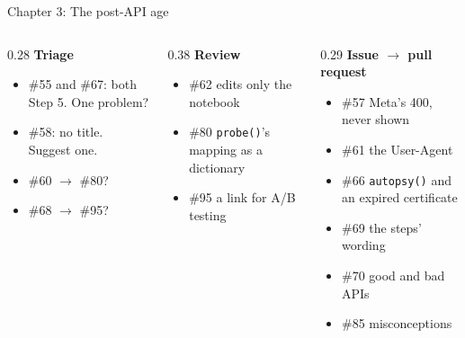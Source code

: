 \documentclass[9pt,aspectratio=169]{beamer}
\begin{document}
\begin{frame}{Chapter 3: The post-API age}
    \begin{columns}[T]
        \begin{column}{0.28\textwidth}
            \textbf{Triage}
            \begin{itemize}\small
                \item \#55 and \#67: both Step 5. One problem?
                \item \#58: no title. Suggest one.
                \item \#60 $\to$ \#80?
                \item \#68 $\to$ \#95?
            \end{itemize}
        \end{column}
        \begin{column}{0.38\textwidth}
            \textbf{Review}
            \begin{itemize}\small
                \item \#62 edits only the notebook
                \item \#80 \texttt{probe()}'s mapping as a dictionary
                \item \#95 a link for A/B testing
            \end{itemize}
        \end{column}
        \begin{column}{0.29\textwidth}
            \textbf{Issue $\to$ pull request}
            \begin{itemize}\small
                \item \#57 Meta's 400, never shown
                \item \#61 the User-Agent
                \item \#66 \texttt{autopsy()} and an expired certificate
                \item \#69 the steps' wording
                \item \#70 good and bad APIs
                \item \#85 misconceptions
            \end{itemize}
        \end{column}
    \end{columns}
\end{frame}
\end{document}
